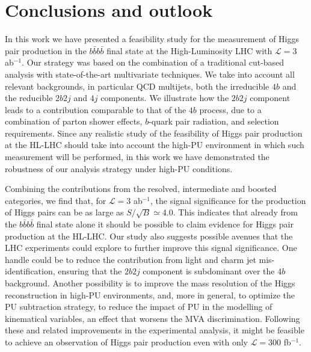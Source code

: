 \section{Conclusions and outlook}
\label{sec:conclusions}

In this work we have presented a feasibility study for
 the measurement of Higgs pair production in the $b\bar{b}b\bar{b}$
final state at the High-Luminosity LHC with $\mathcal{L}=3$ ab$^{-1}$.
%
Our strategy was based on the combination of a traditional
cut-based analysis with state-of-the-art multivariate techniques.
%
We take into account 
all relevant backgrounds, in particular
QCD multijets, both  the irreducible $4b$
and the reducible 
$2b2j$ and $4j$ components.
%
We illustrate how the $2b2j$ component leads to
a contribution comparable to that of the $4b$ process,
due to a combination of  parton shower effects, $b$-quark 
pair radiation, and selection requirements.
%
Since any realistic study of the feasibility of Higgs pair
production at the HL-LHC should take into account the
high-PU environment in which such measurement will be performed,
in this work we have demonstrated the robustness of our analysis strategy
under high-PU conditions.

Combining the contributions from the resolved,
intermediate and boosted categories, we find that, for
$\mathcal{L}=3$ ab$^{-1}$, the
signal significance for
the production of Higgs pairs can be as large as $S/\sqrt{B}\simeq 4.0$.
%
This indicates that already from the $b\bar{b}b\bar{b}$
final state alone
it should be possible to claim evidence for Higgs pair production at
the HL-LHC.
%
Our study also suggests possible avenues that the LHC experiments
could explore to further improve this signal significance.
%
One handle could be to reduce the contribution from light and charm
jet mis-identification, ensuring that the
$2b2j$ component is subdominant over the $4b$ background.
%
Another possibility is to improve the mass resolution of the Higgs
reconstruction
in high-PU environments, and, more in general,
to optimize the PU subtraction
strategy, to reduce the impact of PU in the modelling
of kinematical variables, an effect that worsens the MVA discrimination.
%
Following these and related improvements in the experimental
analysis, it might be feasible to achieve
an observation of Higgs pair production even with only
$\mathcal{L}=300$ fb$^{-1}$.

